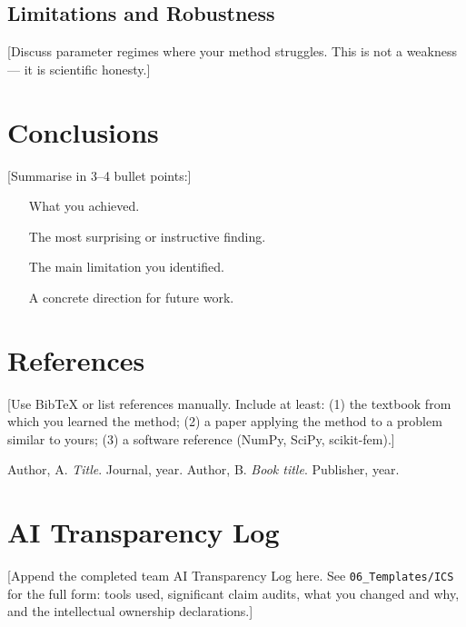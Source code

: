 \documentclass[11pt,a4paper]{article}
\theoremstyle{definition}
\theoremstyle{remark}
\begin{document}
\subsection{Limitations and Robustness}
[Discuss parameter regimes where your method struggles. This is not a weakness ---
it is scientific honesty.]

\newpage
\section{Conclusions}

[Summarise in 3--4 bullet points:]
\begin{itemize}[leftmargin=2em]
\item [What you achieved.]
\item [The most surprising or instructive finding.]
\item [The main limitation you identified.]
\item [A concrete direction for future work.]
\end{itemize}

\newpage
\section*{References}

[Use BibTeX or list references manually. Include at least: (1) the textbook from
which you learned the method; (2) a paper applying the method to a problem
similar to yours; (3) a software reference (NumPy, SciPy, scikit-fem).]

\begin{thebibliography}{9}
 Author, A. \emph{Title}. Journal, year.
 Author, B. \emph{Book title}. Publisher, year.
\end{thebibliography}

\newpage
\appendix
\section{AI Transparency Log}

[Append the completed team AI Transparency Log here. See
\texttt{06\_Templates/ICS} for the full form: tools used, significant claim audits,
what you changed and why, and the intellectual ownership declarations.]
\end{document}

